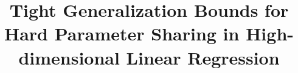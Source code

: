 \documentclass{article}
\begin{document}
\title{Tight Generalization Bounds for Hard Parameter Sharing in High-dimensional Linear Regression}
\maketitle



%


%
%





\appendix






\end{document}
